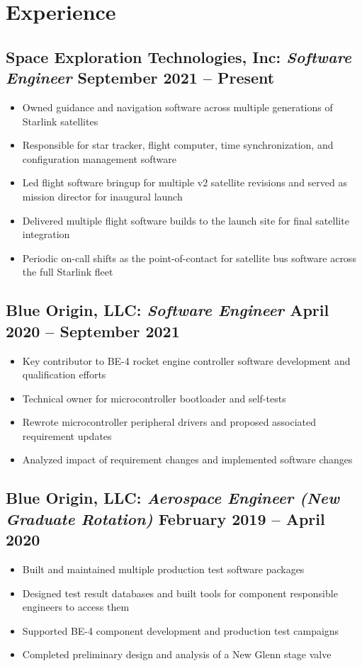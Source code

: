 \documentclass{article}
\begin{document}
\section{Experience}

\subsection{\textbf{Space Exploration Technologies, Inc:} \textit{Software Engineer} \hfill September 2021 -- Present}
\begin{itemize}
    \item Owned guidance and navigation software across multiple generations of Starlink satellites
    \item Responsible for star tracker, flight computer, time synchronization, and configuration management software
    \item Led flight software bringup for multiple v2 satellite revisions and served as mission director for inaugural launch
    \item Delivered multiple flight software builds to the launch site for final satellite integration
    \item Periodic on-call shifts as the point-of-contact for satellite bus software across the full Starlink fleet
\end{itemize}

\subsection{\textbf{Blue Origin, LLC:} \textit{Software Engineer} \hfill April 2020 -- September 2021}
\begin{itemize}
    \item Key contributor to BE-4 rocket engine controller software development and qualification efforts
    \item Technical owner for microcontroller bootloader and self-tests
    \item Rewrote microcontroller peripheral drivers and proposed associated requirement updates
    \item Analyzed impact of requirement changes and implemented software changes
\end{itemize}

\subsection{\textbf{Blue Origin, LLC:} \textit{Aerospace Engineer (New Graduate Rotation)} \hfill February 2019 -- April 2020}
\begin{itemize}
    \item Built and maintained multiple production test software packages
    \item Designed test result databases and built tools for component responsible engineers to access them
    \item Supported BE-4 component development and production test campaigns
    \item Completed preliminary design and analysis of a New Glenn stage valve
\end{itemize}
\end{document}
